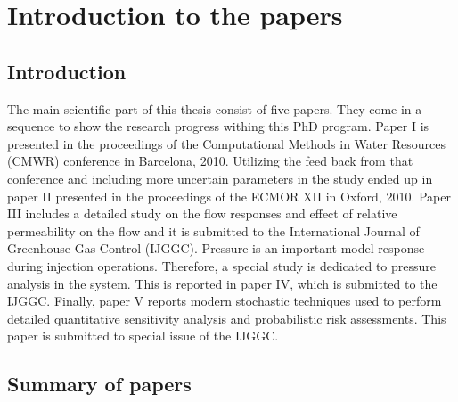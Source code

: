 \chapter{Introduction to the papers}

\pagebreak
\section{Introduction}

The main scientific part of this thesis consist of five papers. They come in a
sequence to show the research progress withing this PhD program. Paper I is
presented in the proceedings of the Computational Methods in Water Resources
(CMWR) conference in Barcelona, 2010. Utilizing the feed back from that
conference and including more uncertain parameters in the study ended up in
paper II presented in the proceedings of the ECMOR XII in Oxford, 2010. Paper
III includes a detailed study on the flow responses and effect of relative
permeability on the flow and it is submitted to the International Journal of
Greenhouse Gas Control (IJGGC). Pressure is an important model response during
injection operations. Therefore, a special study is dedicated to pressure
analysis in the system. This is reported in paper IV, which is submitted to the
IJGGC. Finally, paper V reports modern stochastic techniques used to perform
detailed quantitative sensitivity analysis and probabilistic risk assessments.
This paper is submitted to special issue of the IJGGC.

\section{Summary of papers}

